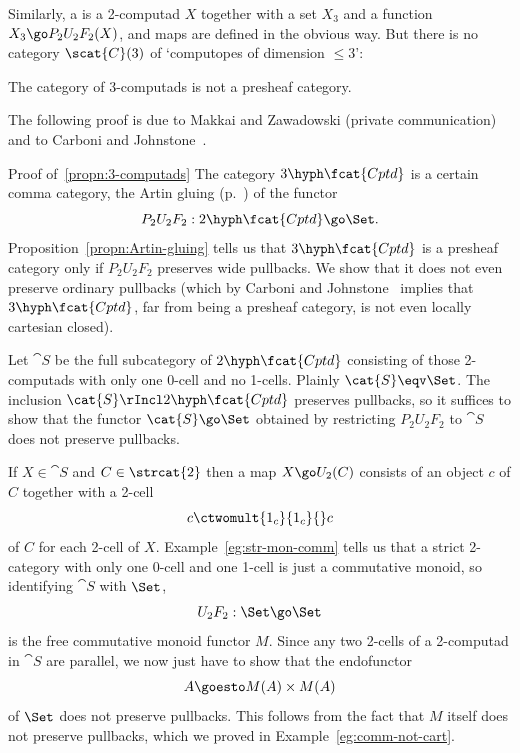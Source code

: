 Similarly, a  is a 2-computad $X$ 
together with a set $X_3$ and a function $X_3 \go P_2 U_2 F_2 (X)$, and
maps are defined in the obvious way.  But there is no category
$\scat{C}(3)$ of `computopes of dimension $\leq 3$':

\begin{propn}	
The category of 3-computads is not a presheaf category.
\end{propn}
% 
The following proof is due to Makkai%
%
%
and Zawadowski%
%
%
(private communication)
and to Carboni%
%
%
and Johnstone~\cite{CJcorr}.%
%
%

% 
\begin{prooflike}{Proof of~\ref{propn:3-computads}}
The category $3\hyph\fcat{Cptd}$ is a certain comma category, the Artin%
%
%
%
%
gluing (p.~\pageref{p:Artin}) of the functor
\[
P_2 U_2 F_2: 2\hyph\fcat{Cptd} \go \Set.
\]
Proposition~\ref{propn:Artin-gluing} tells us that $3\hyph\fcat{Cptd}$ is a
presheaf category only if $P_2 U_2 F_2$ preserves wide pullbacks.
We show that it does not even preserve ordinary pullbacks (which by Carboni
and Johnstone~\cite[4.4(ii)]{CJ} implies that $3\hyph\fcat{Cptd}$, far from
being a presheaf category, is not even locally cartesian closed).  

Let $\cat{S}$ be the full subcategory of $2\hyph\fcat{Cptd}$ consisting of
those 2-computads with only one 0-cell and no 1-cells.  Plainly $\cat{S}
\eqv \Set$.  The inclusion $\cat{S} \rIncl 2\hyph\fcat{Cptd}$ preserves
pullbacks, so it suffices to show that the functor $\cat{S} \go \Set$
obtained by restricting $P_2 U_2 F_2$ to $\cat{S}$ does not preserve
pullbacks.  

If $X\in\cat{S}$ and $C \in \strcat{2}$ then a map $X \go U_2(C)$ consists
of an object $c$ of $C$ together with a 2-cell
\[
c \ctwomult{1_c}{1_c}{} c
\]
of $C$ for each 2-cell of $X$.  Example~\ref{eg:str-mon-comm}%
%
%
tells us that a strict 2-category with only one 0-cell and one 1-cell is
just a commutative monoid, so identifying $\cat{S}$ with $\Set$,
\[
U_2 F_2: \Set \go \Set
\]
is the free commutative monoid functor $M$.  Since any two 2-cells of a
2-computad in $\cat{S}$ are parallel, we now just have to show that the
endofunctor 
\[
A \goesto M(A) \times M(A)
\]
of $\Set$ does not preserve pullbacks.  This follows from the fact that $M$
itself does not preserve pullbacks, which we proved in
Example~\ref{eg:comm-not-cart}.  
\done
\end{prooflike}%
%
%
%
%










